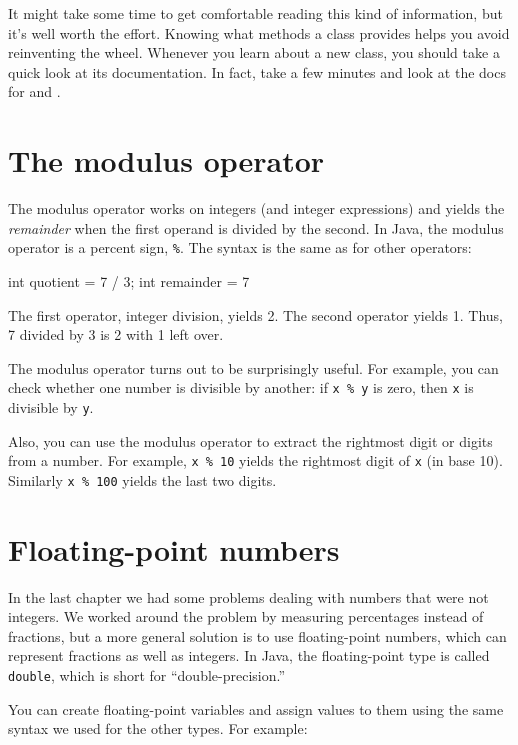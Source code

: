 It might take some time to get comfortable reading this kind of information, but it's well worth the effort.
Knowing what methods a class provides helps you avoid reinventing the wheel.
Whenever you learn about a new class, you should take a quick look at its documentation.
In fact, take a few minutes and look at the docs for  and .


\section{The modulus operator}

The modulus operator works on integers (and integer expressions) and yields the {\em remainder} when the first operand is divided by the second.
In Java, the modulus operator is a percent sign, {\tt \%}.
The syntax is the same as for other operators:

\begin{code}
    int quotient = 7 / 3;
    int remainder = 7 %
\end{code}

The first operator, integer division, yields 2.
The second operator yields 1.
Thus, 7 divided by 3 is 2 with 1 left over.

The modulus operator turns out to be surprisingly useful.
For example, you can check whether one number is divisible by another: if {\tt x \% y} is zero, then {\tt x} is divisible by {\tt y}.

Also, you can use the modulus operator to extract the rightmost digit or digits from a number.
For example, {\tt x \% 10} yields the rightmost digit of {\tt x} (in base 10).
Similarly {\tt x \% 100} yields the last two digits.


\section{Floating-point numbers}

In the last chapter we had some problems dealing with numbers that were not integers.
We worked around the problem by measuring percentages instead of fractions, but a more general solution is to use floating-point numbers, which can represent fractions as well as integers.
In Java, the floating-point type is called {\tt double}, which is short for ``double-precision.''

You can create floating-point variables and assign values to them using the same syntax we used for the other types.
For example:

